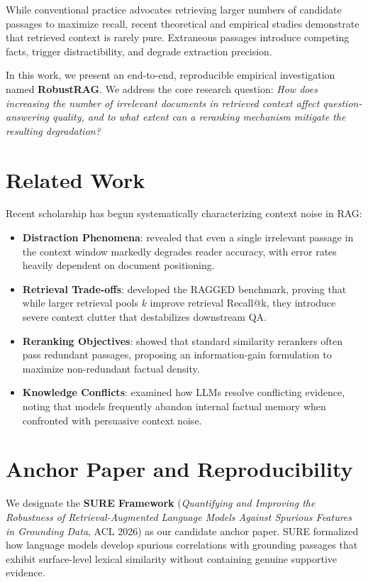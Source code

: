 \documentclass[conference]{IEEEtran}
\begin{document}
While conventional practice advocates retrieving larger numbers of candidate passages to maximize recall, recent theoretical and empirical studies demonstrate that retrieved context is rarely pure. Extraneous passages introduce competing facts, trigger distractibility, and degrade extraction precision. 

In this work, we present an end-to-end, reproducible empirical investigation named \textbf{RobustRAG}. We address the core research question: \textit{How does increasing the number of irrelevant documents in retrieved context affect question-answering quality, and to what extent can a reranking mechanism mitigate the resulting degradation?}

\section{Related Work}
Recent scholarship has begun systematically characterizing context noise in RAG:
\begin{itemize}
    \item \textbf{Distraction Phenomena}: \cite{distracting2025} revealed that even a single irrelevant passage in the context window markedly degrades reader accuracy, with error rates heavily dependent on document positioning.
    \item \textbf{Retrieval Trade-offs}: \cite{ragged2025} developed the RAGGED benchmark, proving that while larger retrieval pools $k$ improve retrieval Recall@k, they introduce severe context clutter that destabilizes downstream QA.
    \item \textbf{Reranking Objectives}: \cite{infogain2025} showed that standard similarity rerankers often pass redundant passages, proposing an information-gain formulation to maximize non-redundant factual density.
    \item \textbf{Knowledge Conflicts}: \cite{astute2025} examined how LLMs resolve conflicting evidence, noting that models frequently abandon internal factual memory when confronted with persuasive context noise.
\end{itemize}

\section{Anchor Paper and Reproducibility}
We designate the \textbf{SURE Framework} (\textit{Quantifying and Improving the Robustness of Retrieval-Augmented Language Models Against Spurious Features in Grounding Data}, ACL 2026) \cite{sure2026} as our candidate anchor paper. SURE formalized how language models develop spurious correlations with grounding passages that exhibit surface-level lexical similarity without containing genuine supportive evidence. 
\end{document}
